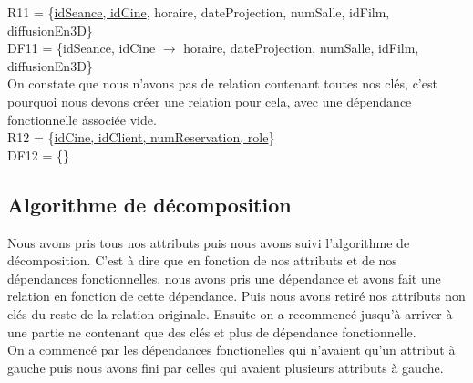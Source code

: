 \documentclass[a4paper,sffamily,12pt]{article}
\begin{document}
					\newpage 
					
					R11 = \{\underline{idSeance, idCine}, horaire, dateProjection, numSalle, idFilm, diffusionEn3D\} \\ DF11 = \{idSeance, idCine $\rightarrow$ horaire, dateProjection, numSalle, idFilm, diffusionEn3D\} \\
					
					On constate que nous n'avons pas de relation contenant toutes nos clés, c'est pourquoi nous devons créer une relation pour cela, avec une dépendance fonctionnelle associée vide.\\
												
					\noindent R12 = \{\underline{idCine, idClient, numReservation, role}\} \\ DF12 = \{\} \\
	
					\vspace{0.5cm}
	
			\subsection{Algorithme de décomposition}
	
				\vspace{0.5cm}
				
				Nous avons pris tous nos attributs puis nous avons suivi l'algorithme de décomposition. C'est à dire que en fonction de nos attributs et de nos dépendances fonctionnelles, nous avons pris une dépendance et avons fait une relation en fonction de cette dépendance. Puis nous avons retiré nos attributs non clés du reste de la relation originale. Ensuite on a recommencé jusqu'à arriver à une partie ne contenant que des clés et plus de dépendance fonctionnelle.\\
				\indent On a commencé par les dépendances fonctionelles qui n'avaient qu'un attribut à gauche puis nous avons fini par celles qui avaient plusieurs attributs à gauche.
	
			\newpage
			
\end{document}
